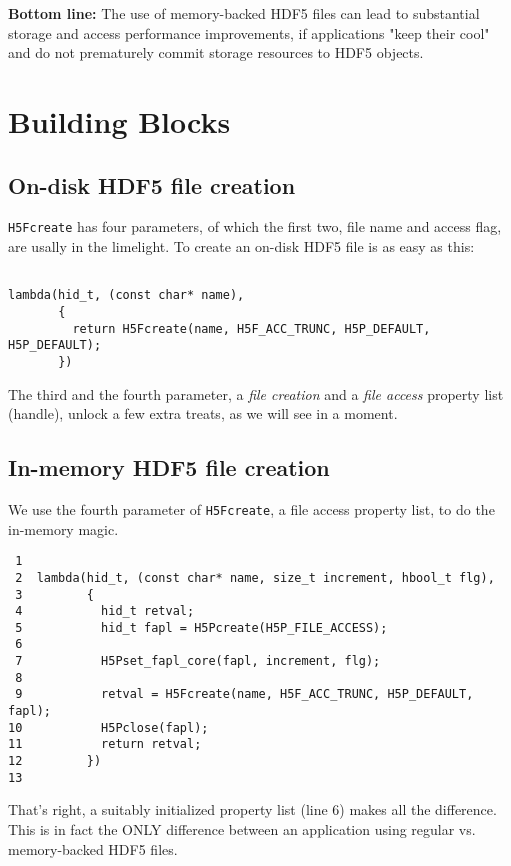 \documentclass[a4paper, 12pt]{article}
\begin{document}
\textbf{\textbf{Bottom line:}} The use of memory-backed HDF5 files can lead to substantial
storage and access performance improvements, if applications "keep their cool"
and do not prematurely commit storage resources to HDF5 objects.

\section{Building Blocks \label{org877f7e6}}
\label{sec:org5c78c99}

\subsection{On-disk HDF5 file creation \label{orgcf43042}}
\label{sec:orgf9792d3}

\texttt{H5Fcreate} has four parameters, of which the first two, file name and access
flag, are usally in the limelight. To create an on-disk HDF5 file is as easy as
this:

\begin{verbatim}

lambda(hid_t, (const char* name),
       {
         return H5Fcreate(name, H5F_ACC_TRUNC, H5P_DEFAULT, H5P_DEFAULT);
       })

\end{verbatim}

The third and the fourth parameter, a \emph{file creation} and a \emph{file access}
property list (handle), unlock a few extra treats, as we will see in a moment.

\subsection{In-memory HDF5 file creation \label{org0787562}}
\label{sec:org93eb665}

We use the fourth parameter of \texttt{H5Fcreate}, a file access property list, to do
the in-memory magic.

\begin{verbatim}
 1
 2  lambda(hid_t, (const char* name, size_t increment, hbool_t flg),
 3         {
 4           hid_t retval;
 5           hid_t fapl = H5Pcreate(H5P_FILE_ACCESS);
 6
 7           H5Pset_fapl_core(fapl, increment, flg);
 8
 9           retval = H5Fcreate(name, H5F_ACC_TRUNC, H5P_DEFAULT, fapl);
10           H5Pclose(fapl);
11           return retval;
12         })
13
\end{verbatim}

That's right, a suitably initialized property list (line 6) makes all
the difference. This is in fact the ONLY difference between an application
using regular vs. memory-backed HDF5 files.
\end{document}
